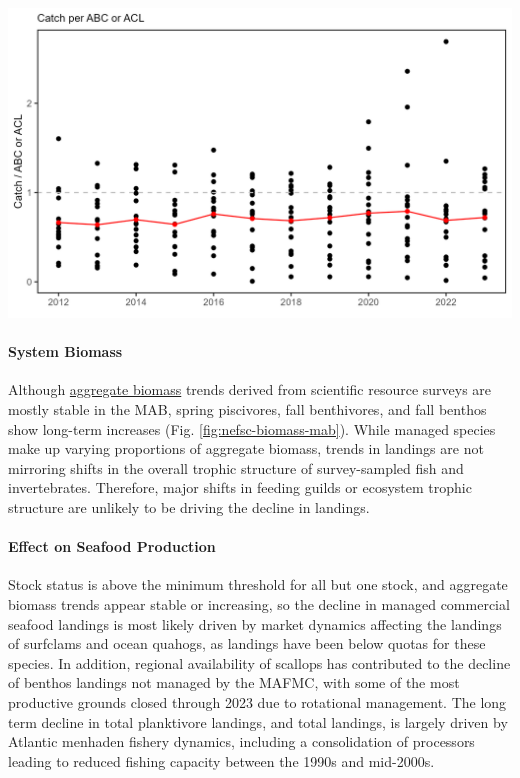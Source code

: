 \documentclass[
  10pt,
]{article}
\let\origfigure\figure
\let\endorigfigure\endfigure
\renewenvironment{figure}[1][2] {
    \expandafter\origfigure\expandafter[H]
} {
    \endorigfigure
}
\begin{document}
\begin{figure}

{\centering \includegraphics[width=6.5in]{images/MidAtlantic/abcacl_catch_MidAtlantic_2025-09-05} 

}

\caption{Catch divided by ABC/ACL for MAFMC managed fisheries. High points are recreational black sea bass (up to 2021) and scup (2022). Red line indicates the median ratio across all fisheries.}\label{fig:abcacl-catch}
\end{figure}

\paragraph{System Biomass}\label{system-biomass}

Although \href{https://noaa-edab.github.io/catalog/aggregate_biomass.html}{aggregate biomass} trends derived from scientific resource surveys are mostly stable in the MAB, spring piscivores, fall benthivores, and fall benthos show long-term increases (Fig. \ref{fig:nefsc-biomass-mab}). While managed species make up varying proportions of aggregate biomass, trends in landings are not mirroring shifts in the overall trophic structure of survey-sampled fish and invertebrates. Therefore, major shifts in feeding guilds or ecosystem trophic structure are unlikely to be driving the decline in landings.

\paragraph{Effect on Seafood Production}\label{effect-on-seafood-production}

Stock status is above the minimum threshold for all but one stock, and aggregate biomass trends appear stable or increasing, so the decline in managed commercial seafood landings is most likely driven by market dynamics affecting the landings of surfclams and ocean quahogs, as landings have been below quotas for these species. In addition, regional availability of scallops has contributed to the decline of benthos landings not managed by the MAFMC, with some of the most productive grounds closed through 2023 due to rotational management. The long term decline in total planktivore landings, and total landings, is largely driven by Atlantic menhaden fishery dynamics, including a consolidation of processors leading to reduced fishing capacity between the 1990s and mid-2000s.
\end{document}
